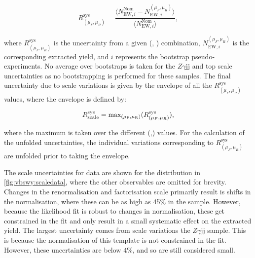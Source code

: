\begin{equation}\label{eq:scaleunc}
  R^{\text{sys}}_{(\mu_F,\mu_R)} = \frac{\langle N_{\text{EW},i}^{\text{Nom}}-N_{\text{EW}, i}^{(\mu_F,\mu_R)}\rangle}{\langle N_{\text{EW},i}^{\text{Nom}}\rangle},
\end{equation}

where $R^{\text{sys}}_{(\mu_F,\mu_R)}$ is the uncertainty from a given (\muf, \mur) combination, $N_{\text{EW}, i}^{(\mu_F,\mu_R)}$ is the corresponding extracted \ewwy yield, and $i$ represents the bootstrap pseudo-experiments. No average over bootstraps is taken for the $Z\gamma$jj and top scale uncertainties as no bootstrapping is performed for these samples. The final uncertainty due to scale variations is given by the envelope of all the $R^{\text{sys}}_{(\mu_F,\mu_R)}$ values, where the envelope is defined by:

\begin{equation}\label{eq:scaleunc}
  R^{\text{sys}}_{\text{scale}} = \text{max}_{(\mu_\text{F},\mu_\text{R})}(R^{\text{sys}}_{(\mu_F,\mu_R)}),
\end{equation}

where the maximum is taken over the different (\muf,\mur) values. For the calculation of the unfolded uncertainties, the individual variations corresponding to $R^{\text{sys}}_{(\mu_F,\mu_R)}$ are unfolded prior to taking the envelope.

The scale uncertainties for data are shown for the \mjj distribution in \ref{fig:vbswy:scaledata}, where the other observables are omitted for brevity. Changes in the renormalisation and factorisation scale primarily result is shifts in the normalisation, where these can be as high as 45\% in the \SHERPA \qcdwy sample. However, because the likelihood fit is robust to changes in normalisation, these get constrained in the fit and only result in a small systematic effect on the extracted \ewwy yield. The largest uncertainty comes from scale variations the $Z\gamma$jj sample. This is because the normalisation of this template is not constrained in the fit. However, these uncertainties are below $4\%$, and so are still considered small.

